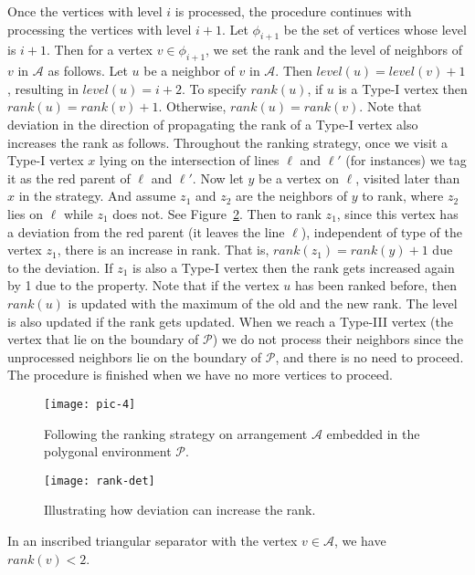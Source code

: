 \documentclass[a4paper,UKenglish]{lipics-v2018}
\theoremstyle{definition}
\begin{document}
Once the vertices with level $i$ is processed, the procedure continues with processing the vertices with level $i+1$. Let $\phi_{i+1}$ be the set of vertices whose level is $i+1$. Then for a vertex $v \in \phi_{i+1}$, we set the rank and the level of neighbors of $v$ in $\mathcal A$ as follows. Let $u$ be a neighbor of $v$ in $\mathcal A$. Then $level(u)=level(v)+1$, resulting in $level(u)=i+2$. To specify $rank(u)$, if $u$ is a Type-I vertex then $rank(u)=rank(v)+1$. Otherwise, $rank(u)=rank(v)$.
Note that deviation in the direction of propagating the rank of a Type-I vertex also increases the rank as follows. Throughout the ranking strategy, once we visit a Type-I vertex $x$ lying on the intersection of lines $\ell$ and $\ell'$ (for instances) we tag it as the red parent of $\ell$ and $\ell'$. Now let $y$ be a vertex on $\ell$, visited later than $x$ in the strategy. And assume $z_1$ and $z_2$ are the neighbors of $y$ to rank, where $z_2$ lies on $\ell$ while $z_1$ does not. See Figure~\ref{rank-det}. Then to rank $z_1$, since this vertex has a deviation from the red parent (it leaves the line $\ell$),  independent of type of the vertex $z_1$, there is an increase in rank. That is, $rank(z_1)=rank(y)+1$ due to the deviation. If $z_1$ is also a Type-I vertex then the rank  gets increased again by 1 due to the property.
Note that if the vertex $u$ has been ranked before, then $rank(u)$ is updated with the maximum of the old and the new rank. The level is also updated if the rank gets updated. When we reach a Type-III vertex (the vertex that lie on the boundary of $\mathcal P$)  we do not process their neighbors since the unprocessed neighbors lie on the boundary of $\mathcal P$, and there is no need to proceed. The procedure is finished when we have no more vertices to proceed.

\begin{figure}[h]
\centering
\texttt{[image: pic-4]}
\caption{Following the ranking strategy on arrangement $\mathcal A$ embedded in the polygonal environment $\mathcal P$. }
\label{propagation-pic}
\end{figure}

\begin{figure}[h]
\centering
\texttt{[image: rank-det]}
\caption{Illustrating how deviation can increase the rank.}
\label{rank-det}
\end{figure}



\begin{lemma}
In an inscribed triangular separator with the vertex $v \in \mathcal A$, we have  $rank(v) <2$.
\end{lemma}
\end{document}
